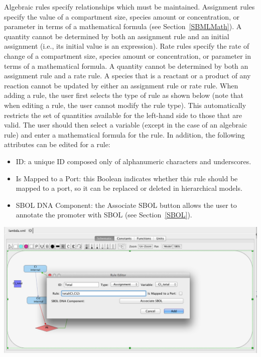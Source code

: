 \documentclass[titlepage,11pt]{article}
\begin{document}
\noindent
Algebraic rules specify relationships which must be maintained.  Assignment rules specify the value of a compartment size, species amount or concentration, or parameter in terms of a mathematical formula (see Section~\ref{SBMLMath}).  A quantity cannot be determined by both an assignment rule and an initial assignment (i.e., its initial value is an expression).  Rate rules specify the rate of change of a compartment size, species amount or concentration, or parameter in terms of a mathematical formula.  A quantity cannot be determined by both an assignment rule and a rate rule.  A species that is a reactant or a product of any reaction cannot be updated by either an assignment rule or rate rule.  When adding a rule, the user first selects the type of rule as shown below (note that when editing a rule, the user cannot modify the rule type).  
This automatically restricts the set of quantities available for the left-hand side to those that are valid.  The user should then select a variable (except in the case of an algebraic rule) and enter a mathematical formula for the rule.  In addition, the following attributes can be edited for a rule:
\begin{itemize}
\item ID: a unique ID composed only of alphanumeric characters and underscores.
\item Is Mapped to a Port: this Boolean indicates whether this rule should be mapped to a port, so it can be replaced or deleted in hierarchical models.
\item SBOL DNA Component: the Associate SBOL button allows the user to annotate the promoter with SBOL (see Section~\ref{SBOL}).
\end{itemize}

\begin{center}
\includegraphics[width=160mm]{screenshots/rule}
\end{center}
\end{document}
